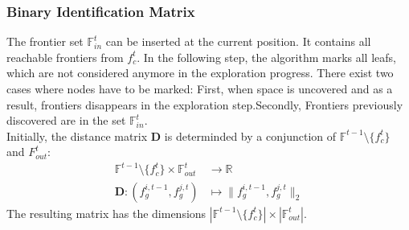 \documentclass[twocolumn]{svjour3}[2016]
\begin{document}
\subsubsection{Binary Identification Matrix}
The frontier set $\mathbb{F}^t_{in}$ can be inserted at the current position. It contains all reachable frontiers from $f^t_c$. In the following step, the algorithm marks all leafs, which are not considered anymore in the exploration progress. There exist two cases where nodes have to be marked: First, when space is uncovered and as a result, frontiers disappears in the exploration step.Secondly, Frontiers previously discovered are in the set $\mathbb{F}^t_{in}$.\\
Initially, the distance matrix $\textbf{D}$ is determinded by a conjunction of $\mathbb{F}^{t-1}\text{\textbackslash}\{f^t_c\}$ and ${F}^t_{out}$:
\begin{align}
\mathbb{F}^{t-1}\text{\textbackslash}\{f^t_c\} \times \mathbb{F}^t_{out} &\longrightarrow \mathbb{R}\\
\textbf{D}:(f^{i,t-1}_g, f^{j,t}_g)&\longmapsto\|f^{i,t-1}_g,f^{j,t}_g\|_2
\end{align}
The resulting matrix has the dimensions $|\mathbb{F}^{t-1}\text{\textbackslash}\{f^t_c\}|\times|\mathbb{F}^t_{out}|$.
\end{document}
